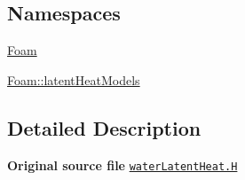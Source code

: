 \subsection*{Namespaces}
\begin{DoxyCompactItemize}
\item 
 \hyperlink{namespaceFoam}{Foam}
\item 
 \hyperlink{namespaceFoam_1_1latentHeatModels}{Foam\+::latent\+Heat\+Models}
\end{DoxyCompactItemize}


\subsection{Detailed Description}
{\bfseries Original source file} \href{../../../home/carlo/data/GeN-Foam/GeN-Foam_ffn/GeN-Foam/GeN-Foam/classes/thermalHydraulics/src/physicsModels/phaseChangeModels/latentHeatModels/water/waterLatentHeat.H}{\tt water\+Latent\+Heat.\+H} 